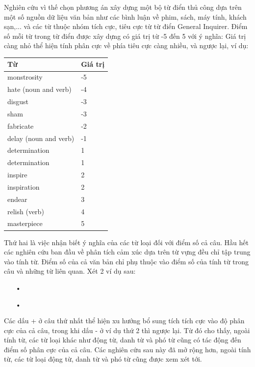 Nghiên cứu \cite{taboada2011lexicon} vì thế chọn phương án xây dựng một bộ từ điển thủ công dựa trên một số nguồn dữ liệu văn bản như các bình luận về phim, sách, máy tính, khách sạn,... và các từ thuộc nhóm tích cực, tiêu cực từ từ điển General Inquirer. Điểm số mỗi từ trong từ điển được xây dựng có giá trị từ -5 đến 5 với ý nghĩa: Giá trị càng nhỏ thể hiện tính phân cực về phía tiêu cực càng nhiều, và ngược lại, ví dụ:
\begin{table}[H]
\begin{tabular}{l l}
\hline
\textbf{Từ} & \textbf{Giá trị} 
\\ \hline
monstrosity & -5
\\ 
hate (noun and verb) & -4
\\ 
disgust & -3
\\ 
sham & -3
\\ 
fabricate & -2
\\ 
delay (noun and verb) & -1
\\
determination & 1
\\
determination & 1
\\ 
inspire & 2
\\ 
inspiration & 2
\\ 
endear & 3
\\ 
relish (verb) & 4
\\ 
masterpiece & 5
\\ \hline
\end{tabular}
\end{table}

Thứ hai là việc nhận biết ý nghĩa của các từ loại đối với điểm số cả câu. Hầu hết các nghiên cứu ban đầu về phân tích cảm xúc dựa trên từ vựng đều chỉ tập trung vào tính từ. Điểm số của cả văn bản chỉ phụ thuộc vào điểm số của tính từ trong câu và những từ liên quan. 
Xét 2 ví dụ sau: 
\begin{itemize}
\item[•] 
\item[•] 
\end{itemize}
Các dấu + ở câu thứ nhất thể hiện xu hướng bổ sung tích tích cực vào độ phân cực của cả câu, trong khi dấu - ở ví dụ thứ 2 thì ngược lại. Từ đó cho thấy, ngoài tính từ, các từ loại khác như động từ, danh từ và phó từ cũng có tác động đến điểm số phân cực của cả câu. Các nghiên cứu sau này đã mở rộng hơn, ngoài tính từ, các từ loại động từ, danh từ và phó từ cũng được xem xét tới. \\

